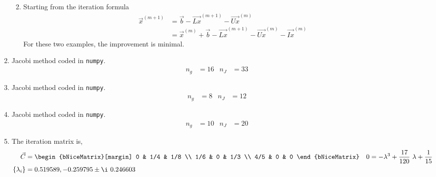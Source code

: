 \begin{enumerate}
\begin{enumerate}
\begin{figure}[H]
                    \end{figure}

              \item Starting from the iteration formula
                    \begin{align}
                        \vec{x}^{(m+1)} & = \vec{b} - \vec{Lx}^{(m + 1)}
                        - \vec{Ux}^{(m)}                                 \\
                                        & = \vec{x}^{(m)} + \vec{b}
                        - \vec{Lx}^{(m + 1)} - \vec{Ux}^{(m)} - \vec{Ix}^{(m)}
                    \end{align}
                    For these two examples, the improvement is minimal.
          \end{enumerate}

    \item Jacobi method coded in \texttt{numpy}.
          \begin{align}
              n_g & = 16 & n_J & = 33
          \end{align}

    \item Jacobi method coded in \texttt{numpy}.
          \begin{align}
              n_g & = 8 & n_J & = 12
          \end{align}

    \item Jacobi method coded in \texttt{numpy}.
          \begin{align}
              n_g & = 10 & n_J & = 20
          \end{align}

    \item The iteration matrix is,
          \begin{align}
              \vec{C}       & = \begin{bNiceMatrix}[margin]
                                    0   & 1/4 & 1/8 \\
                                    1/6 & 0   & 1/3 \\
                                    4/5 & 0   & 0
                                \end{bNiceMatrix}                         &
              0             & = -\lambda^3 + \frac{17}{120}\ \lambda + \frac{1}{15} \\
              \{\lambda_i\} & = 0.519589, -0.259795 \pm \i\ 0.246603
          \end{align}


\end{enumerate}
